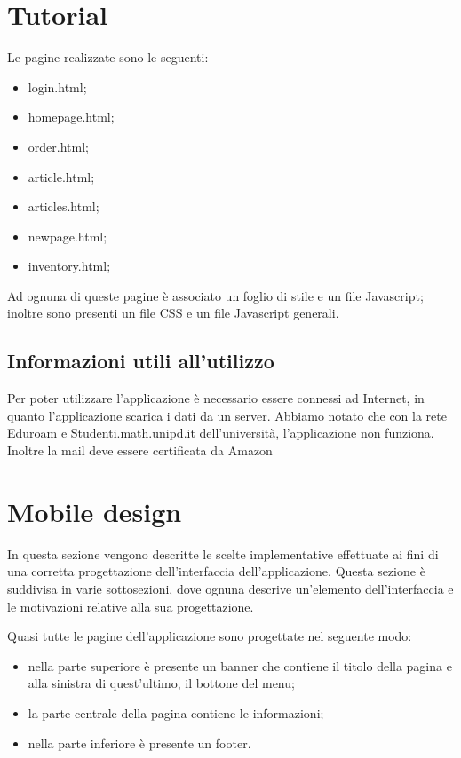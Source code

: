 \documentclass[12pt, a4paper, titlepage]{report}
\begin{document}
	\section{Tutorial}
	Le pagine realizzate sono le seguenti:
	\begin{itemize}
		\item login.html;
		\item homepage.html;
		\item order.html;
		\item article.html;
		\item articles.html;
		\item newpage.html;
		\item inventory.html;
	\end{itemize}
	Ad ognuna di queste pagine è associato un foglio di stile e un file Javascript; inoltre sono presenti un file CSS e un file Javascript generali.
	
	\subsection{Informazioni utili all'utilizzo}
	Per poter utilizzare l'applicazione è necessario essere connessi ad Internet, in quanto l'applicazione scarica i dati da un server. Abbiamo notato che con la rete Eduroam e Studenti.math.unipd.it dell'università, l'applicazione non funziona. Inoltre la mail deve essere certificata da Amazon 
	
	\section{Mobile design}
	In questa sezione vengono descritte le scelte implementative effettuate ai fini di una corretta progettazione dell'interfaccia dell'applicazione. Questa sezione è suddivisa in varie sottosezioni, dove ognuna descrive un'elemento dell'interfaccia e le motivazioni relative alla sua progettazione.
	
	Quasi tutte le pagine dell'applicazione sono progettate nel seguente modo:
	\begin{itemize}
		\item nella parte superiore è presente un banner che contiene il titolo della pagina e alla sinistra di quest'ultimo, il bottone del menu;
		\item la parte centrale della pagina contiene le informazioni;
		\item nella parte inferiore è presente un footer.
	\end{itemize}
	
\end{document}
